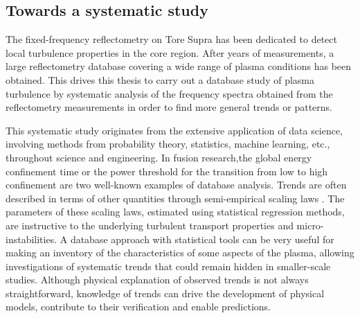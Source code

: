 

\subsection{Towards a systematic study}


The fixed-frequency reflectometry on Tore Supra has been dedicated to detect local turbulence properties in the core region. After years of measurements, a large reflectometry database covering a wide range of plasma conditions has been obtained. This drives this thesis to carry out a database study of plasma turbulence by systematic analysis of the frequency spectra obtained from the reflectometry measurements in order to find more general trends or patterns.


This systematic study originates from the extensive application of data science, involving methods from probability theory, statistics, machine learning, etc., throughout science and engineering. In fusion research,the global energy confinement time \cite{Greenwald_1984_PRL} or the power threshold for the transition from low to high confinement \cite{Martin_2008_JoP} are two well-known examples of database analysis. Trends are often described in terms of other quantities through semi-empirical scaling laws \cite{Yushmanov_1990_NF,Verdoolaege_2015_NF}. The parameters of these scaling laws, estimated using statistical regression methods, are instructive to the underlying turbulent transport properties and micro-instabilities. A database approach with statistical tools can be very useful for making an inventory of the characteristics of some aspects of the plasma, allowing investigations of systematic trends that could remain hidden in smaller-scale studies. Although physical explanation of observed trends is not always straightforward, knowledge of trends can drive the development of physical models, contribute to their verification and enable predictions.


